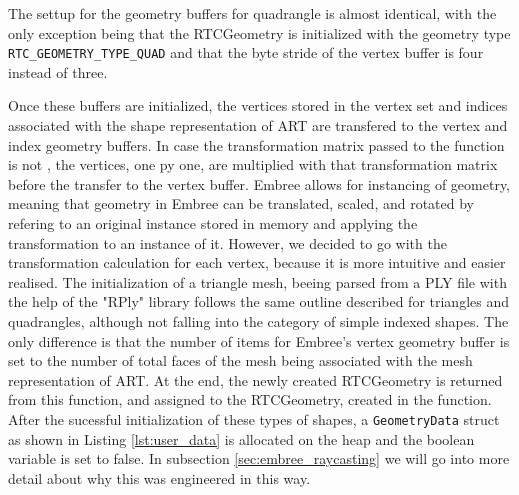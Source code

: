 The settup for the geometry buffers for quadrangle is almost identical, with the only exception being that the RTCGeometry is initialized with the geometry type \texttt{RTC\_GEOMETRY\_TYPE\_QUAD} and that the byte stride of the vertex buffer is four instead of three.

Once these buffers are initialized, the vertices stored in the vertex set and indices associated with the shape representation of ART are transfered to the vertex and index geometry buffers. In case the transformation matrix passed to the function is not , the vertices, one py one, are multiplied with that transformation matrix before the transfer to the vertex buffer. Embree allows for instancing of geometry, meaning that geometry in Embree can be translated, scaled, and rotated by refering to an original instance stored in memory and applying the transformation to an instance of it. However, we decided to go with the transformation calculation for each vertex, because it is more intuitive and easier realised.
The initialization of a triangle mesh, beeing parsed from a PLY file with the help of the "RPly" library \cite{rply2016} follows the same outline described for triangles and quadrangles, although not falling into the category of simple indexed shapes. The only difference is that the number of items for Embree's vertex geometry buffer is set to the number of total faces of the mesh being associated with the mesh representation of ART.
At the end, the newly created RTCGeometry is returned from this function, and assigned to the RTCGeometry, created in the  function. After the sucessful initialization of these types of shapes, a \texttt{GeometryData} struct as shown in Listing \ref{lst:user_data} is allocated on the heap and the  boolean variable is set to false. In subsection \ref{sec:embree_raycasting} we will go into more detail about why this was engineered in this way.


